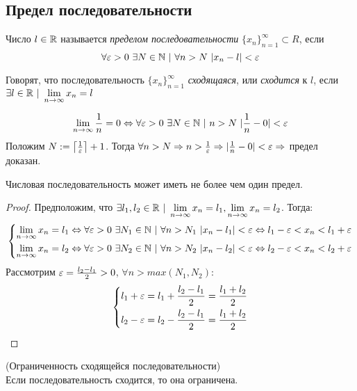 \subsection{Предел последовательности}

\begin{definition}
    Число $l \in \mathbb{R}$ называется \textit{пределом последовательности} $\{x_n\}_{n = 1}^\infty \subset R$, если
    $$
        \forall \eps > 0\ \exists N \in \N\ |\ \forall n > N\ |x_n - l| < \eps
    $$
\end{definition}

\begin{definition}
    Говорят, что последовательность $\{x_n\}_{n = 1}^\infty$ \textit{сходящаяся}, или \textit{сходится} к $l$, если $\exists l \in \mathbb{R}\ |\ \lim\limits_{n \to \infty} x_n = l$
\end{definition}

\begin{example}
    $$
        \lim\limits_{n \to \infty} \frac{1}{n} = 0 \Leftrightarrow \forall \varepsilon > 0\ \exists N \in \mathbb{N}\ |\ n > N\ |\frac{1}{n} - 0| < \varepsilon
    $$
    Положим $N := \left\lceil\frac{1}{\varepsilon}\right\rceil + 1$. Тогда $\forall n > N \Rightarrow n > \frac{1}{\varepsilon} \Rightarrow |\frac{1}{n} - 0| < \varepsilon \Rightarrow$ предел доказан.
\end{example}

\begin{theorem}
    Числовая последовательность может иметь не более чем один предел.
\end{theorem}

\begin{proof}
    Предположим, что $\exists l_1, l_2 \in \mathbb{R}\ |\ \lim\limits_{n \to \infty} x_n = l_1, \lim\limits_{n \to \infty} x_n = l_2$. Тогда:
    $$
        \left\{\begin{aligned}
        \lim\limits_{n \to \infty} x_n = l_1 \Leftrightarrow \forall \varepsilon > 0\ \exists N_1 \in \mathbb{N}\ |\ \forall n > N_1\ |x_n - l_1| < \varepsilon \Leftrightarrow l_1 - \varepsilon < x_n < l_1 + \varepsilon
        \\
        \lim\limits_{n \to \infty} x_n = l_2 \Leftrightarrow \forall \varepsilon > 0\ \exists N_2 \in \mathbb{N}\ |\ \forall n > N_2\ |x_n - l_2| < \varepsilon \Leftrightarrow l_2 - \varepsilon < x_n < l_2 + \varepsilon
        \end{aligned}\right.
    $$
    Рассмотрим $\varepsilon = \frac{l_2 - l_1}{2} > 0$, $\forall n > max(N_1, N_2)$:
    $$
        \left\{\begin{aligned}
        l_1 + \varepsilon = l_1 + \frac{l_2 - l_1}{2} = \frac{l_1 + l_2}{2}
        \\
        l_2 - \varepsilon = l_2 - \frac{l_2 - l_1}{2} = \frac{l_1 + l_2}{2}
        \end{aligned}\right.
    $$
\end{proof}

\begin{theorem} (Ограниченность сходящейся последовательности)\\
    Если последовательность сходится, то она ограничена.
\end{theorem}

